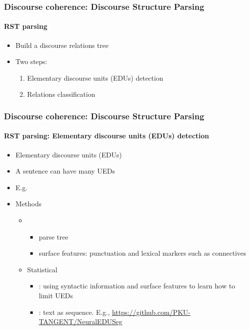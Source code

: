 \documentclass[xcolor=table]{beamer}
\begin{document}
\begin{frame}
	\frametitle{Discourse coherence: Discourse Structure Parsing}
	\framesubtitle{RST parsing}
	
	\begin{itemize}
		\item Build a discourse relations tree
		\item Two steps: 
		\begin{enumerate}
			\item Elementary discourse units (EDUs) detection
			\item Relations classification
		\end{enumerate}
	\end{itemize}

	\begin{center}
	\end{center}
	
\end{frame}

\begin{frame}
	\frametitle{Discourse coherence: Discourse Structure Parsing}
	\framesubtitle{RST parsing: Elementary discourse units (EDUs) detection}
	
	\begin{itemize}
		\item Elementary discourse units (EDUs)
		\item A sentence can have many UEDs 
		\item E.g. 
		\item Methods 
		\begin{itemize}
			\item {}
			\begin{itemize}
				\item parse tree
				\item surface features: punctuation and lexical markers such as connectives
			\end{itemize}
			\item Statistical
			\begin{itemize}
				\item {}: using syntactic information and surface features to learn how to limit UEDs
				\item {}: text as sequence. E.g., \url{https://github.com/PKU-TANGENT/NeuralEDUSeg}
			\end{itemize}
		\end{itemize}
	\end{itemize}
	
\end{frame}
\end{document}
